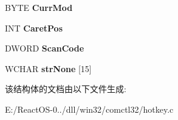 \begin{DoxyCompactItemize}
\item 
\mbox{\label{structtag_h_o_t_k_e_y___i_n_f_o_a397fe30d9a3ebea8d5d7ef62ad7ad817}} 
B\+Y\+TE {\bfseries Curr\+Mod}
\item 
\mbox{\label{structtag_h_o_t_k_e_y___i_n_f_o_a74d2470dd33a4ad6d52a5f11d5c7437e}} 
I\+NT {\bfseries Caret\+Pos}
\item 
\mbox{\label{structtag_h_o_t_k_e_y___i_n_f_o_ab9559bd97b3df3eada880eb95df82062}} 
D\+W\+O\+RD {\bfseries Scan\+Code}
\item 
\mbox{\label{structtag_h_o_t_k_e_y___i_n_f_o_a8603a40e57952d643bb80b350a554d2c}} 
W\+C\+H\+AR {\bfseries str\+None} \mbox{[}15\mbox{]}
\end{DoxyCompactItemize}


该结构体的文档由以下文件生成\+:\begin{DoxyCompactItemize}
\item 
E\+:/\+React\+O\+S-\/0../dll/win32/comctl32/hotkey.\+c\end{DoxyCompactItemize}
